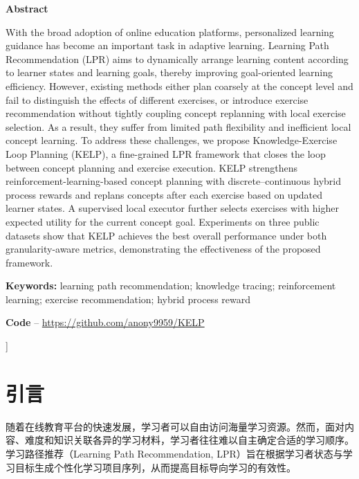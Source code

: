 \documentclass[UTF8,a4paper,zihao=5,twocolumn]{ctexart}
\begin{document}
{\begin{center}
{\bfseries{} Abstract}
\end{center}
{\rmfamily
With the broad adoption of online education platforms, personalized learning guidance has become an important task in adaptive learning. Learning Path Recommendation (LPR) aims to dynamically arrange learning content according to learner states and learning goals, thereby improving goal-oriented learning efficiency. However, existing methods either plan coarsely at the concept level and fail to distinguish the effects of different exercises, or introduce exercise recommendation without tightly coupling concept replanning with local exercise selection. As a result, they suffer from limited path flexibility and inefficient local concept learning. To address these challenges, we propose Knowledge-Exercise Loop Planning (KELP), a fine-grained LPR framework that closes the loop between concept planning and exercise execution. KELP strengthens reinforcement-learning-based concept planning with discrete--continuous hybrid process rewards and replans concepts after each exercise based on updated learner states. A supervised local executor further selects exercises with higher expected utility for the current concept goal. Experiments on three public datasets show that KELP achieves the best overall performance under both granularity-aware metrics, demonstrating the effectiveness of the proposed framework.
\par}
\vspace{0.5em}
{\rmfamily\noindent\textbf{Keywords:} learning path recommendation; knowledge tracing; reinforcement learning; exercise recommendation; hybrid process reward}
\vspace{0.4em}

{\rmfamily\noindent\textbf{Code} -- \url{https://github.com/anony9959/KELP}}
\vspace{1.0em}
}]

\section{引言}
随着在线教育平台的快速发展，学习者可以自由访问海量学习资源\cite{KorDK2019,ZhaHC2019}。然而，面对内容、难度和知识关联各异的学习材料，学习者往往难以自主确定合适的学习顺序。学习路径推荐（Learning Path Recommendation, LPR）旨在根据学习者状态与学习目标生成个性化学习项目序列，从而提高目标导向学习的有效性\cite{NabLR2020,GuaCX2025,LiuTL2019}。
\end{document}
